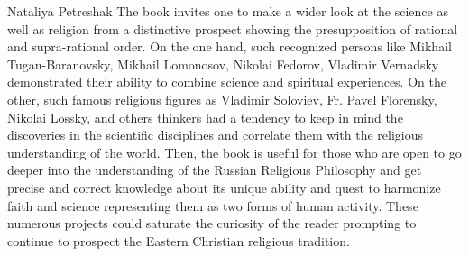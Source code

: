 \begin{recplenv}{Nataliya Petreshak}
The book invites one to make a wider look at the science as well as religion from a
distinctive prospect showing the presupposition of rational and supra-rational order. On the one hand, such recognized
persons like Mikhail Tugan-Baranovsky, Mikhail Lomonosov, Nikolai Fedorov, Vladimir Vernadsky demonstrated their
ability to combine science and spiritual experiences. On the other, such famous religious figures as Vladimir
Soloviev, Fr. Pavel Florensky, Nikolai Lossky, and others thinkers had a tendency to keep in mind the discoveries in
the scientific disciplines and correlate them with the religious understanding of the world. Then, the book is useful for
those who are open to go deeper into the understanding of the Russian Religious Philosophy and get precise and correct
knowledge about its unique ability and quest to harmonize faith and science representing them as two forms of human
activity. These numerous projects could saturate the curiosity of the reader prompting to continue to prospect the
Eastern Christian religious tradition.



\end{recplenv}

